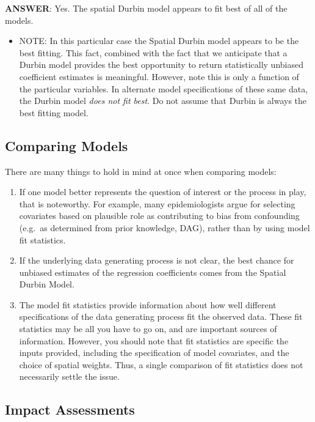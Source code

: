 \documentclass[
]{book}
\providecommand{\tightlist}{%
  \setlength{\itemsep}{0pt}\setlength{\parskip}{0pt}}
\newenvironment{rmdblock}[1]
  {%
  \begin{itemize}
  \renewcommand{\labelitemi}{
    \raisebox{-.7\height}[0pt][0pt]{
      {\setkeys{Gin}{width=3em,keepaspectratio}\texttt{[image: images/\#1]}}
    }
  }
  \item
  }
  {
  \end{itemize}
  }
\newenvironment{rmdwarning}
  {\begin{rmdblock}{warning}}
  {\end{rmdblock}}
\begin{document}
\textbf{ANSWER}: Yes. The spatial Durbin model appears to fit best of all of the models.

\begin{rmdwarning}
NOTE: In this particular case the Spatial Durbin model appears to be the best fitting. This fact, combined with the fact that we anticipate that a Durbin model provides the best opportunity to return statistically unbiased coefficient estimates is meaningful. However, note this is only a function of the particular variables. In alternate model specifications of these same data, the Durbin model \emph{does not fit best}. Do not assume that Durbin is always the best fitting model.
\end{rmdwarning}

\hypertarget{comparing-models}{%
\subsection{Comparing Models}\label{comparing-models}}

There are many things to hold in mind at once when comparing models:

\begin{enumerate}
\def\labelenumi{\arabic{enumi}.}
\tightlist
\item
  If one model better represents the question of interest or the process in play, that is noteworthy. For example, many epidemiologists argue for selecting covariates based on plausible role as contributing to bias from confounding (e.g.~as determined from prior knowledge, DAG), rather than by using model fit statistics.
\item
  If the underlying data generating process is not clear, the best chance for unbiased estimates of the regression coefficients comes from the Spatial Durbin Model.
\item
  The model fit statistics provide information about how well different specifications of the data generating process fit the observed data. These fit statistics may be all you have to go on, and are important sources of information. However, you should note that fit statistics are specific the inputs provided, including the specification of model covariates, and the choice of spatial weights. Thus, a single comparison of fit statistics does not necessarily settle the issue.
\end{enumerate}

\hypertarget{impact-assessments}{%
\subsection{Impact Assessments}\label{impact-assessments}}
\end{document}
